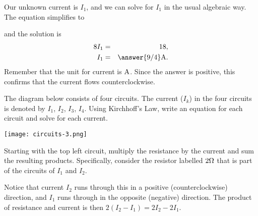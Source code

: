 \documentclass{ximera}
\begin{document}
\begin{exploration}
\begin{example}
\begin{solution}
  Our unknown current is $I_1$, and we can solve for $I_1$ in the usual algebraic way. The equation simplifies to

  and the solution is
  \begin{eqnarray*}
    8I_1 &=& 18, \\
    I_1 &=& \answer{9/4} \amp.
  \end{eqnarray*}
  Remember that the unit for current is $\amp$. Since the answer is positive, this confirms that the current flows
  counterclockwise.
\end{solution}

\end{example}

\begin{example}
  The diagram below consists of four circuits. The current ($I_k$) in
  the four circuits is denoted by $I_1$, $I_2$, $I_3$, $I_4$. Using
  Kirchhoff's Law, write an equation for each circuit and solve for
  each current.

  \begin{center}
    \texttt{[image: circuits-3.png]}
  \end{center}

  Starting with the top left circuit, multiply the resistance by the
  current and sum the resulting products. Specifically, consider the
  resistor labelled $2 \ohm$ that is part of the circuits of $I_1$ and
  $I_2$. 
  
  Notice that current $I_2$ runs through this in a positive
  (counterclockwise) direction, and $I_1$ runs through in the opposite
  (negative) direction. The product of resistance and current is then
  $2 (I_2 - I_1) = 2I_2 - 2I_1$.  
  

\end{example}
\end{exploration}
\end{document}
